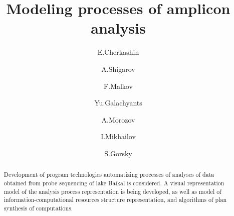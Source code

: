 \documentclass[12pt]{llncs}
\begin{document}
\begin{englishtitle}

\title{Modeling  processes of amplicon analysis}

\author{E.Cherkashin
  \and
  A.Shigarov \and
  F.Malkov \and
  Yu.Galachyants \and
  A.Morozov \and
  I.Mikhailov \and
  S.Gorsky
}



\maketitle
\begin{abstract}
Development of program technologies automatizing processes of analyses of data obtained from probe sequencing of lake Baikal is considered.  A visual representation model of the analysis process representation is being developed, as well as model of information-computational resources structure representation, and algorithms of plan synthesis of computations.

\end{abstract}
\end{englishtitle}
\end{document}
